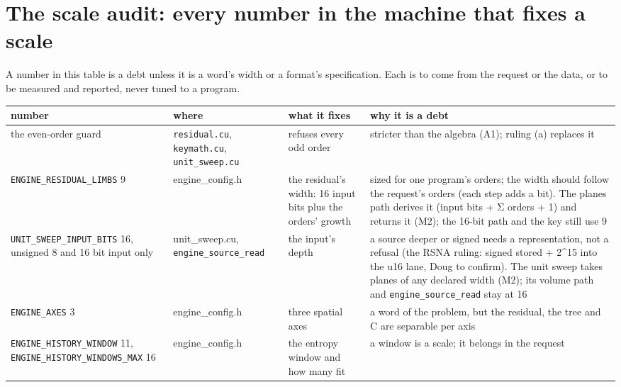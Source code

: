 \section{\texorpdfstring{The scale audit: every number in the machine that fixes a scale}{The scale audit: every number in the machine that fixes a scale}}

A number in this table is a debt unless it is a word's width or a format's specification. Each is to come from the request or the data, or to be measured and reported, never tuned to a program.

{\footnotesize
\setlength{\tabcolsep}{6pt}
\begin{longtable}{>{\RaggedRight\arraybackslash}p{}>{\RaggedRight\arraybackslash}p{}>{\RaggedRight\arraybackslash}p{}>{\RaggedRight\arraybackslash}p{}}
\toprule
number & where & what it fixes & why it is a debt \\
\midrule
\endhead
the even-order guard & \texttt{residual.\allowbreak{}cu}, \texttt{keymath.\allowbreak{}cu}, \texttt{unit\_\allowbreak{}sweep.\allowbreak{}cu} & refuses every odd order & stricter than the algebra (A1); ruling (a) replaces it \\
\texttt{ENGINE\_\allowbreak{}RESIDUAL\_\allowbreak{}LIMBS} 9 & engine\_\allowbreak{}config.h & the residual's width: 16 input bits plus the orders' growth & sized for one program's orders; the width should follow the request's orders (each step adds a bit). The planes path derives it (input bits + Σ orders + 1) and returns it (M2); the 16-bit path and the key still use 9 \\
\texttt{UNIT\_\allowbreak{}SWEEP\_\allowbreak{}INPUT\_\allowbreak{}BITS} 16, unsigned 8 and 16 bit input only & unit\_\allowbreak{}sweep.cu, \texttt{engine\_\allowbreak{}source\_\allowbreak{}read} & the input's depth & a source deeper or signed needs a representation, not a refusal (the RSNA ruling: signed stored + 2\textasciicircum{}15 into the u16 lane, Doug to confirm). The unit sweep takes planes of any declared width (M2); its volume path and \texttt{engine\_\allowbreak{}source\_\allowbreak{}read} stay at 16 \\
\texttt{ENGINE\_\allowbreak{}AXES} 3 & engine\_\allowbreak{}config.h & three spatial axes & a word of the problem, but the residual, the tree and C are separable per axis \\
\texttt{ENGINE\_\allowbreak{}HISTORY\_\allowbreak{}WINDOW} 11, \texttt{ENGINE\_\allowbreak{}HISTORY\_\allowbreak{}WINDOWS\_\allowbreak{}MAX} 16 & engine\_\allowbreak{}config.h & the entropy window and how many fit & a window is a scale; it belongs in the request \\

\end{longtable}}
